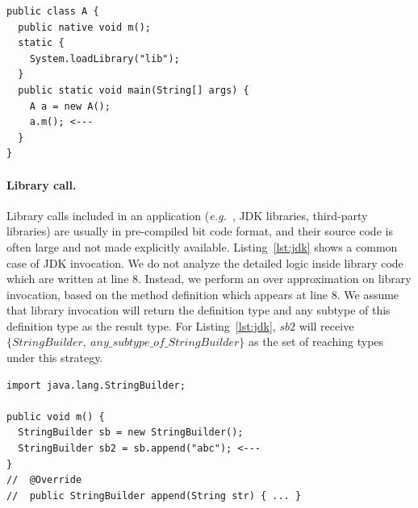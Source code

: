\documentclass{fac}
\newcommand\eg{\textit{e.g.\ }}
\begin{document}
\begin{lstlisting}[caption={Example code for JNI},label={lst:jni}]
public class A {
  public native void m();
  static {
    System.loadLibrary("lib");
  }
  public static void main(String[] args) {
    A a = new A();
    a.m(); <---
  }
}
\end{lstlisting}


\paragraph{Library call.} Library calls included in an application (\eg, JDK libraries, third-party libraries) are usually in pre-compiled bit code format, and their source code is often large and not made explicitly available. Listing~\ref{lst:jdk} shows a common case of JDK invocation. We do not analyze the detailed logic inside library code which are written at line $8$. Instead, we perform an over approximation on library invocation, based on the method definition which appears at line $8$. We assume that library invocation will return the definition type and any subtype of this definition type as the result type. For Listing~\ref{lst:jdk}, $sb2$ will receive $\{StringBuilder,\ any\_subtype\_of\_StringBuilder\}$ as the set of reaching types under this strategy.

\begin{lstlisting}[caption={Example code for JDK library calls},label={lst:jdk}]
import java.lang.StringBuilder;

public void m() {
  StringBuilder sb = new StringBuilder();
  StringBuilder sb2 = sb.append("abc"); <---
}
//  @Override
//  public StringBuilder append(String str) { ... }
\end{lstlisting}

\end{document}
